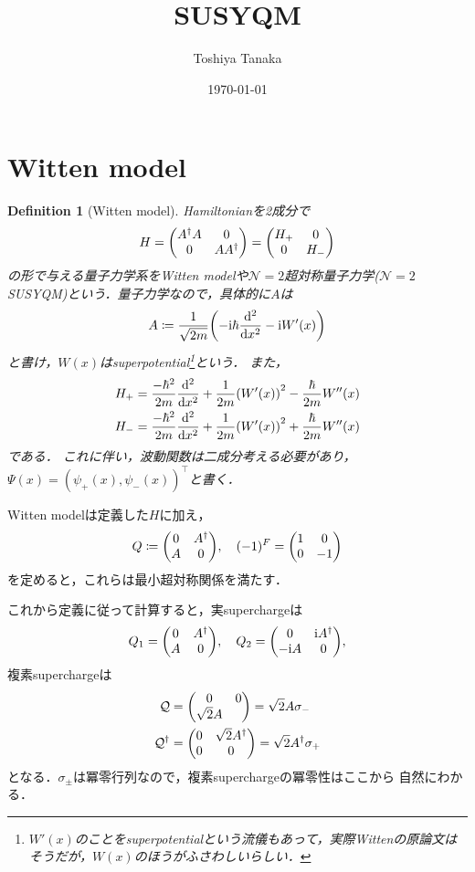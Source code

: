 \documentclass[english, dvipdfmx, a4paper]{jsarticle}
\title{SUSYQM}
\author{Toshiya Tanaka}
\date{\today}
\theoremstyle{break}
\newtheorem{defn}[thm]{Definition}
\renewcommand{\i}{\mathrm{i}}
\newcommand{\N}{\mathcal{N}}
\newcommand{\Q}{\mathcal{Q}}
\begin{document}
	\section{Witten model}
	\begin{defn}[Witten model]
		Hamiltonianを2成分で
		\begin{equation}
			H = \mqty(A^{\dag}A & 0 \\ 0 & AA^{\dag}) = \mqty(H_+ & 0 \\ 0 & H_-)
		\end{equation}
		の形で与える量子力学系をWitten modelや$\N = 2$超対称量子力学($\N = 2$ SUSYQM)という．量子力学なので，具体的に$A$は
		\begin{equation}
			A \coloneqq \frac{1}{\sqrt{2m}}\qty(-\i\hbar\dv[2]{}{x} - \i W'(x))
		\end{equation}
		と書け，$W(x)$はsuperpotential\footnote{$W'(x)$のことをsuperpotentialという流儀もあって，実際Wittenの原論文はそうだが，$W(x)$のほうがふさわしいらしい．}という．
		また，
		\begin{align}
			H_+ &= \frac{-\hbar^2}{2m}\dv[2]{}{x} + \frac{1}{2m}\qty(W'(x))^2 - \frac{\hbar}{2m}W''(x)\\
			H_- &= \frac{-\hbar^2}{2m}\dv[2]{}{x} + \frac{1}{2m}\qty(W'(x))^2 + \frac{\hbar}{2m}W''(x)
		\end{align}
		である．
		これに伴い，波動関数は二成分考える必要があり，$\Psi(x) = (\psi_+(x), \psi_-(x))^{\top}$と書く．
	\end{defn}

	Witten modelは定義した$H$に加え，
	\begin{equation}
		Q \coloneqq \mqty(0 & A^\dag \\ A & 0), \quad (-1)^{F} = \mqty(1 & 0\\ 0 & -1)
	\end{equation}
	を定めると，これらは最小超対称関係を満たす．

	これから定義に従って計算すると，実superchargeは
	\begin{equation}
		Q_1 = \mqty(0 & A^\dag \\ A & 0), \quad Q_2 = \mqty(0 & \i A^\dag \\ -\i A & 0),
	\end{equation}
	複素superchargeは
	\begin{align}
		\Q &= \mqty(0 & 0 \\ \sqrt{2}A) = \sqrt{2}A\sigma_-\\
		\Q^{\dag} &=\mqty(0 & \sqrt{2}A^{\dag} \\ 0 & 0) = \sqrt{2}A^{\dag}\sigma_+
	\end{align}
	となる．$\sigma_{\pm}$は冪零行列なので，複素superchargeの冪零性はここから
	自然にわかる．
\end{document}
